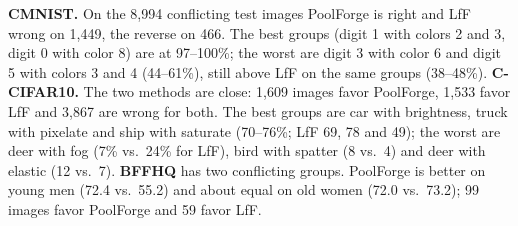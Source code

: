 \textbf{CMNIST.} On the 8{,}994 conflicting test images PoolForge is right and LfF wrong on 1{,}449, the reverse on
466. The best groups (digit 1 with colors 2 and 3, digit 0 with color 8) are at 97--100\%; the worst are digit 3 with
color 6 and digit 5 with colors 3 and 4 (44--61\%), still above LfF on the same groups (38--48\%).
\textbf{C-CIFAR10.} The two methods are close: 1{,}609 images favor PoolForge, 1{,}533 favor LfF and 3{,}867 are
wrong for both. The best groups are car with brightness, truck with pixelate and ship with saturate (70--76\%; LfF
69, 78 and 49); the worst are deer with fog (7\% vs.\ 24\% for LfF), bird with spatter (8 vs.\ 4) and deer with
elastic (12 vs.\ 7).
\textbf{BFFHQ} has two conflicting groups. PoolForge is better on young men (72.4 vs.\ 55.2) and about equal on old
women (72.0 vs.\ 73.2); 99 images favor PoolForge and 59 favor LfF.
